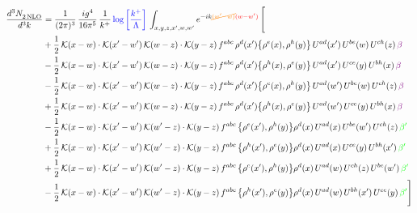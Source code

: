 \documentclass[9pt]{article}
\numberwithin{equation}{section}
\begin{document}
\begin{align}
    \frac{d^{3}N_{2\,\rm NLO}^{\rm}}{d^{3}k}  & = \frac{1}{(2\pi)^{3}}\, \frac{ig^{4}}{16\pi^{5}}\, \frac{1}{k^{+}}\, {\color{blue}\log{\left[\frac{k^{+}}{\Lambda}\right]}}\, \int_{x,y,z,x^{\prime},w,w^{\prime}}e^{-ik{\color{orange}\cancel{(w^{\prime}-w)}}{\color{red}(w-w^{\prime})}}\, \Bigg[\notag \\ & +\frac{1}{2}\,\mathcal{K}(x-w)\cdot\mathcal{K}(x'-w')\,\mathcal{K}(w-z)\cdot\mathcal{K}(y-z)\, f^{abc}\,\rho^{d}(x')\big\{\rho^{e}(x),\rho^{h}(y)\big\}\,U^{ad}(x')\,U^{be}(w)\,U^{ch}(z)\,{\color{violet} \beta}\notag\\ &-\frac{1}{2}\,\mathcal{K}(x-w)\cdot\mathcal{K}(x'-w')\,\mathcal{K}(w-z)\cdot\mathcal{K}(y-z)\, f^{abc}\,\rho^{d}(x')\big\{\rho^{h}(x),\rho^{e}(y)\big\}\,U^{ad}(x')\,U^{ce}(y)\,U^{bh}(x)\,{\color{violet} \beta}\notag\\ &-\frac{1}{2}\,\mathcal{K}(x-w)\cdot\mathcal{K}(x'-w')\,\mathcal{K}(w-z)\cdot\mathcal{K}(y-z)\, f^{abc}\,\rho^{d}(x')\big\{\rho^{e}(x),\rho^{h}(y)\big\}\,U^{ad}(w')\,U^{be}(w)\,U^{ch}(z)\,{\color{violet} \beta}\notag \\ &+\frac{1}{2}\,\mathcal{K}(x-w)\cdot\mathcal{K}(x'-w')\,\mathcal{K}(w-z)\cdot\mathcal{K}(y-z)\, f^{abc}\,\rho^{d}(x')\big\{\rho^{h}(x),\rho^{e}(y)\big\}\,U^{ad}(w')\,U^{ce}(y)\,U^{bh}(x)\,{\color{violet} \beta}\notag\\
&-\frac{1}{2}\,\mathcal{K}(x-w)\cdot\mathcal{K}(x'-w')\,\mathcal{K}(w'-z)\cdot\mathcal{K}(y-z)\, f^{abc}\,\big\{\rho^{e}(x'),\rho^{h}(y)\big\}\rho^{d}(x)\,U^{ad}(x)\,U^{be}(w')\,U^{ch}(z)\,{\color{green} \beta'}\notag \\ & +\frac{1}{2}\,\mathcal{K}(x-w)\cdot\mathcal{K}(x'-w')\,\mathcal{K}(w'-z)\cdot\mathcal{K}(y-z)\, f^{abc}\,\big\{\rho^{h}(x'),\rho^{e}(y)\big\}\rho^{d}(x)\,U^{ad}(x)\,U^{ce}(y)\,U^{bh}(x')\,{\color{green} \beta'} \notag\\ & +\frac{1}{2}\,\mathcal{K}(x-w)\cdot\mathcal{K}(x'-w')\,\mathcal{K}(w'-z)\cdot\mathcal{K}(y-z)\, f^{abc}\,\big\{\rho^{e}(x'),\rho^{h}(y)\big\}\rho^{d}(x)\,U^{ad}(w)\,U^{ch}(z)\,U^{be}(w')\,{\color{green} \beta'} \notag\\
& -\frac{1}{2}\,\mathcal{K}(x-w)\cdot\mathcal{K}(x'-w')\,\mathcal{K}(w'-z)\cdot\mathcal{K}(y-z)\, f^{abc}\,\big\{\rho^{h}(x'),\rho^{e}(y)\big\}\rho^{d}(x)\,U^{ad}(w)\,U^{bh}(x')\,U^{ce}(y)\,{\color{green} \beta'}\Bigg]
\end{align}
\end{document}
